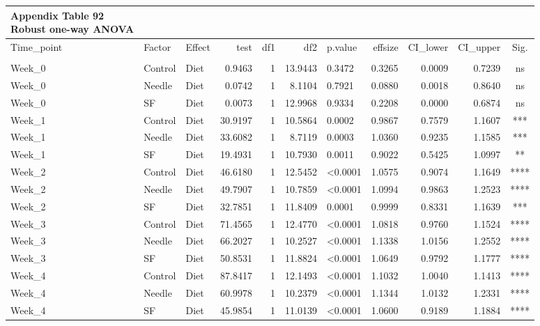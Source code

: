 \documentclass[
  12pt,
  letterpaper,
]{article}
\begin{document}
\begingroup
\fontsize{12.0pt}{14.4pt}\selectfont
\begin{longtable}{lllrrrlrrrc}
\caption*{
{\large \textbf{Appendix Table 92}} \\ 
{\small \textbf{Robust one-way ANOVA}}
} \\ 
\toprule
Time\_point & {Factor} & {Effect} & {test} & {df1} & {df2} & {p.value} & {effsize} & CI\_lower & CI\_upper & {Sig.} \\ 
\midrule\addlinespace[2.5pt]
\multicolumn{11}{l}{Split by Route} \\[2.5pt] 
\midrule\addlinespace[2.5pt]
Week\_0 & Control & Diet & 0.9463 & 1 & 13.9443 & 0.3472 & 0.3265 & 0.0009 & 0.7239 & ns \\ 
Week\_0 & Needle & Diet & 0.0742 & 1 & 8.1104 & 0.7921 & 0.0880 & 0.0018 & 0.8640 & ns \\ 
Week\_0 & SF & Diet & 0.0073 & 1 & 12.9968 & 0.9334 & 0.2208 & 0.0000 & 0.6874 & ns \\ 
Week\_1 & Control & Diet & 30.9197 & 1 & 10.5864 & 0.0002 & 0.9867 & 0.7579 & 1.1607 & *** \\ 
Week\_1 & Needle & Diet & 33.6082 & 1 & 8.7119 & 0.0003 & 1.0360 & 0.9235 & 1.1585 & *** \\ 
Week\_1 & SF & Diet & 19.4931 & 1 & 10.7930 & 0.0011 & 0.9022 & 0.5425 & 1.0997 & ** \\ 
Week\_2 & Control & Diet & 46.6180 & 1 & 12.5452 & <0.0001 & 1.0575 & 0.9074 & 1.1649 & **** \\ 
Week\_2 & Needle & Diet & 49.7907 & 1 & 10.7859 & <0.0001 & 1.0994 & 0.9863 & 1.2523 & **** \\ 
Week\_2 & SF & Diet & 32.7851 & 1 & 11.8409 & 0.0001 & 0.9999 & 0.8331 & 1.1639 & *** \\ 
Week\_3 & Control & Diet & 71.4565 & 1 & 12.4770 & <0.0001 & 1.0818 & 0.9760 & 1.1524 & **** \\ 
Week\_3 & Needle & Diet & 66.2027 & 1 & 10.2527 & <0.0001 & 1.1338 & 1.0156 & 1.2552 & **** \\ 
Week\_3 & SF & Diet & 50.8531 & 1 & 11.8824 & <0.0001 & 1.0649 & 0.9792 & 1.1777 & **** \\ 
Week\_4 & Control & Diet & 87.8417 & 1 & 12.1493 & <0.0001 & 1.1032 & 1.0040 & 1.1413 & **** \\ 
Week\_4 & Needle & Diet & 60.9978 & 1 & 10.2379 & <0.0001 & 1.1344 & 1.0132 & 1.2331 & **** \\ 
Week\_4 & SF & Diet & 45.9854 & 1 & 11.0139 & <0.0001 & 1.0600 & 0.9189 & 1.1884 & **** \\ 

\end{longtable}
\end{document}

